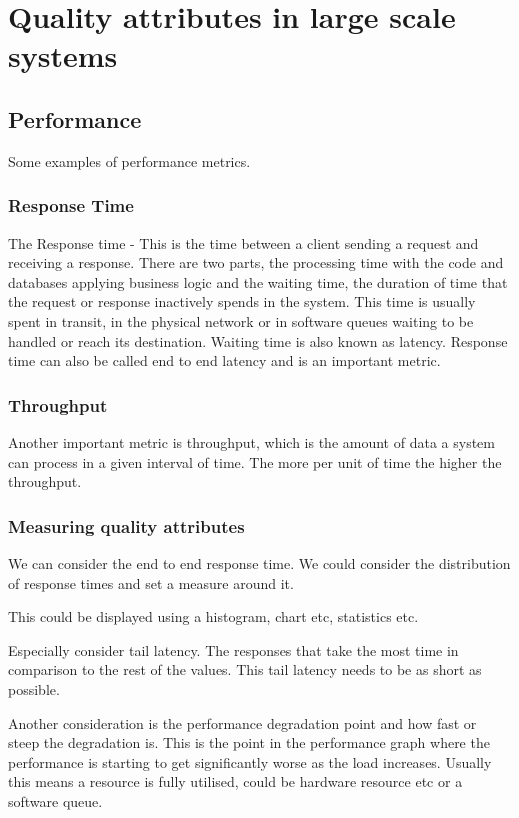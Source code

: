 \chapter{Quality attributes in large scale systems}

\section{Performance}

Some examples of performance metrics.

\subsection{Response Time}
The Response time - This is the time between a client sending a request and receiving a response.
There are two parts, the processing time with the code and databases applying business logic and the waiting time, the duration of time that the request or response inactively spends in the system.
This time is usually spent in transit, in the physical network or in software queues waiting to be handled or reach its destination.
Waiting time is also known as latency.
Response time can also be called end to end latency and is an important metric.

\subsection{Throughput}
Another important metric is throughput, which is the amount of data a system can process in a given interval of time.
The more per unit of time the higher the throughput.

\subsection{Measuring quality attributes}
We can consider the end to end response time.
We could consider the distribution of response times and set a measure around it.

This could be displayed using a histogram, chart etc, statistics etc.

Especially consider tail latency.
The responses that take the most time in comparison to the rest of the values.
This tail latency needs to be as short as possible.

Another consideration is the performance degradation point and how fast or steep the degradation is.
This is the point in the performance graph where the performance is starting to get significantly worse as the load increases.
Usually this means a resource is fully utilised, could be hardware resource etc or a software queue.

